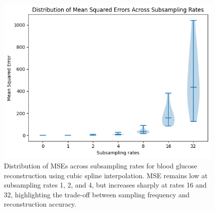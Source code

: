 \begin{figure}[h] %
	\centering
	\includegraphics[width=\linewidth]{Figures/distribution_mses.png} %
	\caption{Distribution of MSEs across subsampling rates for blood glucose reconstruction using cubic spline interpolation. MSE remains low at subsampling rates 1, 2, and 4, but increases sharply at rates 16 and 32, highlighting the trade-off between sampling frequency and reconstruction accuracy.}
	\label{fig:mses}  %
\end{figure}

